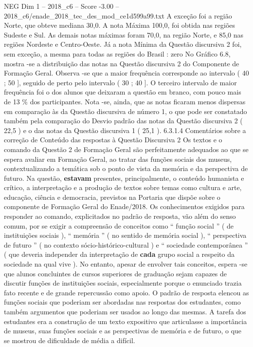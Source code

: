 \begin{textsample}{NEG Dim 1 – 2018\_c6 – Score -3.00 – 2018\_c6/enade\_2018\_tec\_des\_mod\_ce1d599a99.txt}
A exceção foi a região Norte, que obteve mediana 30,0.
A nota Máxima 100,0, foi obtida nas regiões Sudeste e Sul.
As demais notas máximas foram 70,0, na região Norte, e 85,0 nas regiões Nordeste e Centro-Oeste.
Já a nota Mínima da Questão discursiva 2 foi, sem exceção, a mesma para todas as regiões do Brasil : zero No Gráfico 6.8, mostra -se a distribuição das notas na Questão discursiva 2 do Componente de Formação Geral.
Observa -se que a maior frequência corresponde ao intervalo ( 40 ; 50 ], seguido de perto pelo intervalo ( 30 ; 40 ].
O terceiro intervalo de maior frequência foi o dos alunos que deixaram a questão em branco, com pouco mais de 13 \% dos participantes.
Nota -se, ainda, que as notas ficaram menos dispersas em comparação às da Questão discursiva de número 1, o que pode ser constatado também pela comparação do Desvio padrão das notas da Questão discursiva 2 ( 22,5 ) e o das notas da Questão discursiva 1 ( 25,1 ). 6.3.1.4 Comentários sobre a correção de Conteúdo das respostas à Questão Discursiva 2 Os textos e o comando da Questão 2 de Formação Geral são perfeitamente adequados ao que se espera avaliar em Formação Geral, ao tratar das funções sociais dos museus, contextualizando a temática sob o ponto de vista da memória e da perspectiva de futuro.
Na questão, \textbf{estavam} presentes, principalmente, o conteúdo humanista e crítico, a interpretação e a produção de textos sobre temas como cultura e arte, educação, ciência e democracia, previstos na Portaria que dispõe sobre o componente de Formação Geral do Enade/2018.
Os conhecimentos exigidos para responder ao comando, explicitados no padrão de resposta, vão além do senso comum, por se exigir a compreensão de conceitos como “ função social ” ( de instituições sociais ), “ memória ” ( no sentido de memória social ), “ perspectiva de futuro ” ( no contexto sócio-histórico-cultural ) e “ sociedade contemporânea ” ( que deveria independer da interpretação de \textbf{cada} grupo social a respeito da sociedade na qual vive ).
No entanto, apesar de envolver tais conceitos, espera -se que alunos concluintes de cursos superiores de graduação sejam capazes de discutir funções de instituições sociais, especialmente porque o enunciado trazia fato recente e de grande repercussão como apoio.
O padrão de resposta elencou as funções sociais que poderiam ser abordadas nas respostas dos estudantes, como também argumentos que poderiam ser usados ao longo das mesmas.
A tarefa dos estudantes era a construção de um texto expositivo que articulasse a importância de museus, suas funções sociais e as perspectivas de memória e de futuro, o que se mostrou de dificuldade de média a difícil.

\end{textsample}
